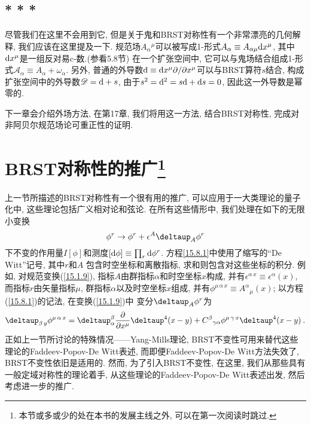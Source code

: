 \subsection*{* * *}
尽管我们在这里不会用到它, 但是关于鬼和BRST对称性有一个非常漂亮的几何解释\cite{14}, 我们应该在这里提及一下. 规范场$A_{\alpha}{}^{\mu}$可以被写成1-形式$A_{\alpha} \equiv A_{\alpha\mu}\mathrm{d} x^{\mu}$, 其中$\mathrm{d} x^{\mu}$是一组反对易c-数.(参看5.8节) 在一个扩张空间中, 它可以与鬼场结合组成1-形式$\mathscr{A}_{\alpha}\equiv A_{\alpha}+\omega_{\alpha}$. 另外, 普通的外导数$\mathrm{d} \equiv \mathrm{d} x^{\mu} \partial /\partial x^{\mu}$可以与BRST算符$s$结合, 构成扩张空间中的外导数$\mathscr{D}=\mathrm{d}+s$, 由于$s^{2}=\mathrm{d}^{2}=s\mathrm{d}+\mathrm{d} s=0$, 因此这一外导数是幂零的.

下一章会介绍外场方法, 在第17章, 我们将用这一方法, 结合BRST对称性, 完成对非阿贝尔规范场论可重正性的证明.

\section[BRST对称性的推广]{BRST对称性的推广\footnote{本节或多或少的处在本书的发展主线之外, 可以在第一次阅读时跳过.}}

上一节所描述的BRST对称性有一个很有用的推广, 可以应用于一大类理论的量子化中, 这些理论包括广义相对论和弦论. 在所有这些情形中,
我们处理在如下的无限小变换
\begin{equation}
\phi ^{r}\rightarrow \phi ^{r}+\epsilon ^{A}\deltaup_{A}\phi ^{r}  \label{15.8.1}
\end{equation}%
下不变的作用量$I[\phi]$和测度$[\mathrm{d} \phi ]\equiv \prod_{r}\mathrm{d}\phi ^{r}$. 方程\eqref{15.8.1}中使用了缩写的``De Witt''记号, 其中$r$和$A$%
包含时空坐标和离散指标, 求和则包含对这些坐标的积分. 例如, 对规范变换(\ref{15.1.9}), 指标$A$由群指标$\alpha $和时空坐标$x$构成, 并有$\epsilon ^{\alpha\, x}\equiv
\epsilon ^{\alpha }(x)$, 而指标$r$由矢量指标$\mu $, 群指标$\alpha $以及时空坐标$x$组成, 并有$\phi^{\mu\, \alpha \,x}\equiv A^{\alpha }{}_{\mu }(x)$; 
以方程(\ref{15.8.1})的记法, 在变换(\ref{15.1.9})中 变分$\deltaup_{A}\phi ^{r}$为
\[
\deltaup_{\beta \, y}\phi ^{\mu\, \alpha \,x}=\deltaup_{\alpha}^{\beta }\frac{\partial }{\partial x^{\mu }}\deltaup ^{4}(x-y)
+C^{\beta}{}_{\gamma \alpha }\phi ^{\mu\, \gamma\, x}\deltaup^{4}(x-y)\:. 
\]%
正如上一节所讨论的特殊情况------Yang-Mills理论, BRST不变性可用来替代这些理论的Faddeev-Popov-De Witt表述, 而即便Faddeev-Popov-De Witt方法失效了, 
BRST不变性依旧是适用的. 然而, 为了引入BRST不变性, 在这里, 我们从那些具有一般定域对称性的理论着手, 从这些理论的Faddeev-Popov-De Witt表述出发, 然后考虑进一步的推广.%

